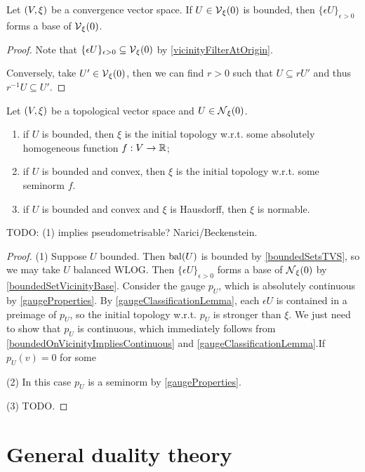 \begin{lemma} \label{boundedSetVicinityBase}
Let $\left( V,\xi \right)$ be a convergence vector space. If $U\in \operatorname{\mathcal{V}}_\xi(0)$ is bounded, then $\{\epsilon U\}_{\epsilon>0}$ forms a base of $\operatorname{\mathcal{V}}_\xi(0)$.
\end{lemma}
\begin{proof}
Note that $\{\epsilon U\}_{\epsilon>0} \subseteq \operatorname{\mathcal{V}}_\xi(0)$ by \ref{vicinityFilterAtOrigin}.

Conversely, take $U'\in \operatorname{\mathcal{V}}_\xi(0)$, then we can find $r>0$ such that $U\subseteq rU'$ and thus $r^{-1}U\subseteq U'$.
\end{proof}

\begin{proposition}
Let $\left( V,\xi \right)$ be a topological vector space and $U\in\operatorname{\mathcal{N}}_\xi(0)$.
\begin{enumerate}
\item if $U$ is bounded, then $\xi$ is the initial topology w.r.t. some absolutely homogeneous function $f: V\to \mathbb{R}$;
\item if $U$ is bounded and convex, then $\xi$ is the initial topology w.r.t. some seminorm $f$.
\item if $U$ is bounded and convex and $\xi$ is Hausdorff, then $\xi$ is normable.
\end{enumerate}
\end{proposition}
TODO: (1) implies pseudometrisable? Narici/Beckenstein.
\begin{proof}
(1) Suppose $U$ bounded. Then $\operatorname{bal}(U)$ is bounded by \ref{boundedSetsTVS}, so we may take $U$ balanced WLOG. Then $\{\epsilon U\}_{\epsilon >0}$ forms a base of $\operatorname{\mathcal{N}}_\xi(0)$ by \ref{boundedSetVicinityBase}. Consider the gauge $p_U$, which is absolutely continuous by \ref{gaugeProperties}. By \ref{gaugeClassificationLemma}, each $\epsilon U$ is contained in a preimage of $p_U$, so the initial topology w.r.t. $p_U$ is stronger than $\xi$. We just need to show that $p_U$ is continuous, which immediately follows from \ref{boundedOnVicinityImpliesContinuous} and \ref{gaugeClassificationLemma}.If $p_U(v) = 0$ for some 

(2) In this case $p_U$ is a seminorm by \ref{gaugeProperties}.

(3) TODO.
\end{proof}


\section{General duality theory}
